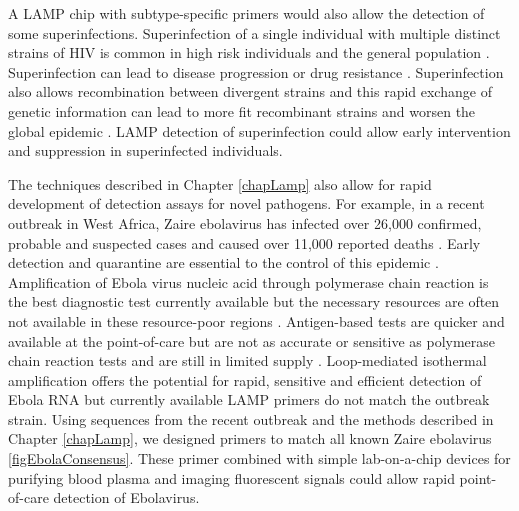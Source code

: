 \documentclass[../sherrill-Mix_thesis.tex]{subfiles}
\begin{document}
		A LAMP chip with subtype-specific primers would also allow the detection of some superinfections. Superinfection of a single individual with multiple distinct strains of HIV is common in high risk individuals \citep{Piantadosi2007,Powell2009,Ronen2013,Wagner2013,Redd2014} and the general population \citep{Redd2012a}. Superinfection can lead to disease progression \citep{Jost2002,Fang2004,Blick2007,Gottlieb2007,Streeck2008,Clerc2010} or drug resistance \citep{Smith2005}. Superinfection also allows recombination between divergent strains \citep{Fang2004,Pernas2006,Blick2007,Piantadosi2007,Streeck2008} and this rapid exchange of genetic information can lead to more fit recombinant strains and worsen the global epidemic \citep{Robertson1995,Gao1999,Hahn2000,Malim2001,Blick2007}. LAMP detection of superinfection could allow early intervention and suppression in superinfected individuals.

		The techniques described in Chapter \ref{chapLamp} also allow for rapid development of detection assays for novel pathogens. For example, in a recent outbreak in West Africa, Zaire ebolavirus has infected over 26,000 confirmed, probable and suspected cases and caused over 11,000 reported deaths \citep{Gire2014,WHOERT2014,WHO2015}. Early detection and quarantine are essential to the control of this epidemic \citep{Chowell2014}. Amplification of Ebola virus nucleic acid through polymerase chain reaction is the best diagnostic test currently available but the necessary resources are often not available in these resource-poor regions \citep{Fauci2014,WHO2015a}. Antigen-based tests are quicker and available at the point-of-care but are not as accurate or sensitive as polymerase chain reaction tests and are still in limited supply \citep{WHO2015a}.  Loop-mediated isothermal amplification offers the potential for rapid, sensitive and efficient detection of Ebola RNA but currently available LAMP primers \citep{Kurosaki2007} do not match the outbreak strain. Using sequences from the recent outbreak \citep{Gire2014,Hoenen2015} and the methods described in Chapter \ref{chapLamp}, we designed primers to match all known Zaire ebolavirus \ref{figEbolaConsensus}. These primer combined with simple lab-on-a-chip devices for purifying blood plasma \citep{Liu2013} and imaging fluorescent signals \citep{Liu2011,Liu2014a} could allow rapid point-of-care detection of Ebolavirus.
\end{document}
